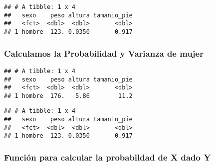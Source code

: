 \documentclass[]{article}
\newenvironment{Shaded}{\begin{snugshade}}{\end{snugshade}}
\newcommand{\KeywordTok}[1]{\textcolor[rgb]{0.13,0.29,0.53}{\textbf{#1}}}
\newcommand{\StringTok}[1]{\textcolor[rgb]{0.31,0.60,0.02}{#1}}
\newcommand{\CommentTok}[1]{\textcolor[rgb]{0.56,0.35,0.01}{\textit{#1}}}
\newcommand{\OperatorTok}[1]{\textcolor[rgb]{0.81,0.36,0.00}{\textbf{#1}}}
\newcommand{\NormalTok}[1]{#1}
\begin{document}
\begin{verbatim}
## # A tibble: 1 x 4
##   sexo    peso altura tamanio_pie
##   <fct>  <dbl>  <dbl>       <dbl>
## 1 hombre  123. 0.0350       0.917
\end{verbatim}

\subsubsection{Calculamos la Probabilidad y Varianza de
mujer}\label{calculamos-la-probabilidad-y-varianza-de-mujer}

\begin{Shaded}
\end{Shaded}

\begin{verbatim}
## # A tibble: 1 x 4
##   sexo    peso altura tamanio_pie
##   <fct>  <dbl>  <dbl>       <dbl>
## 1 hombre  176.   5.86        11.2
\end{verbatim}

\begin{Shaded}
\end{Shaded}

\begin{verbatim}
## # A tibble: 1 x 4
##   sexo    peso altura tamanio_pie
##   <fct>  <dbl>  <dbl>       <dbl>
## 1 hombre  123. 0.0350       0.917
\end{verbatim}

\subsubsection{Función para calcular la probabildad de X dado
Y}\label{funcion-para-calcular-la-probabildad-de-x-dado-y}
\end{document}
